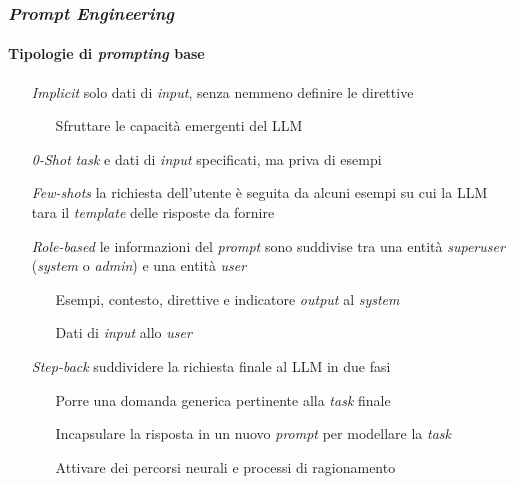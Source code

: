 %
\begin{frame}[t] \frametitle{\emph{Prompt Engineering}}
\framesubtitle{Tipologie di \emph{prompting} base}
{\footnotesize
    \begin{minipage}[t]{\textwidth}
        \begin{itemize}[leftmargin=50pt,align=right]
            \item[\alert{\emph{Implicit}}] solo dati di \emph{input}, senza nemmeno definire le direttive
            \begin{itemize}[leftmargin=15pt,align=right]
                \item[\alert{\faArrowCircleRight}] Sfruttare le capacità emergenti del LLM
            \end{itemize}
            \item[\alert{\emph{0-Shot}}] \emph{task} e dati di \textit{input} specificati, ma priva di esempi
            \item[\alert{\emph{Few-shots}}] la richiesta dell'utente è seguita da alcuni esempi su cui la LLM tara il \emph{template} delle risposte da fornire
            \item[\alert{\emph{Role-based}}] le informazioni del \emph{prompt} sono suddivise tra una entità \emph{superuser} (\emph{system} o \emph{admin}) e una entità \emph{user}
            \begin{itemize}[leftmargin=15pt,align=right]
                \item[\alert{\faArrowCircleRight}] Esempi, contesto, direttive e indicatore \emph{output} al \emph{system}
                \item[\alert{\faArrowCircleRight}] Dati di \emph{input} allo \emph{user}
            \end{itemize}
            \item[\alert{\emph{Step-back}}] suddividere la richiesta finale al LLM in due fasi
            \begin{itemize}[leftmargin=15pt,align=right]
                \item[\alert{\faArrowCircleRight}] Porre una domanda generica pertinente alla \textit{task} finale
                \item[\alert{\faArrowCircleRight}] Incapsulare la risposta in un nuovo \textit{prompt} per modellare la \textit{task}
                \item[\alert{\faExclamationTriangle}] Attivare dei \alert{percorsi neurali} e \alert{processi di ragionamento}

\end{itemize}
\end{itemize}
\end{minipage}}
\end{frame}
